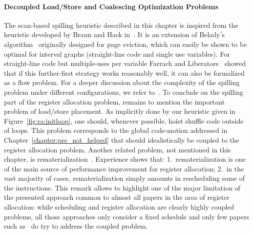 {\paragraph{Decoupled Load/Store and Coalescing Optimization Problems}
The scan-based spilling heuristic described in this chapter is inspired from the heuristic developed by Braun and Hack in~\cite{Braun:2009:CC}.
It is an extension of Belady's algorithm~\cite{belady:1966:storage} originally designed for page eviction, which can easily be shown to be optimal for interval graphs (straight-line code and single use variables).
For straight-line code but multiple-uses per variable Farrach and Liberatore~\cite{farach:98:local} showed that if this further-first strategy works reasonably well, it can also be formalized as a flow problem.
For a deeper discussion about the complexity of the spilling problem under different configurations, we refer to~\cite{Bouchez07b}.
To conclude on the spilling part of the register allocation problem, remains to mention the important problem of load/store placement.
As implicitly done by our heuristic given in Figure~\ref{fig:ra:initloop}, one should, whenever possible, hoist shuffle code outside of loops.
This problem corresponds to the global code-motion addressed in Chapter~\ref{chapter:pre_not_helped} that should idealistically be coupled to the register allocation problem.
Another related problem, not mentioned in this chapter, is rematerialization~\cite{rematerialization}.
Experience shows that:
1.~rematerialization is one of the main source of performance improvement for register allocation;
2.~in the vast majority of cases, rematerialization simply amounts in rescheduling some of the instructions.
This remark allows to highlight one of the major limitation of the presented approach common to almost all papers in the area of register allocation:
while scheduling and register allocation are clearly highly coupled problems, all those approaches only consider a fixed schedule and only few papers such as~\cite{norris1993scheduler,Pinter:1993:RAI,Wang:1994:SPR,Motwani:1995:CRA,Berson:1998:IIS,Codina:2001:UMS,touati,Rawat:2018:ROS} do try to address the coupled problem.

}
